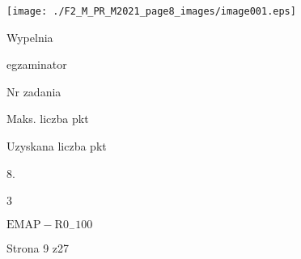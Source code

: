 \documentclass[a4paper,12pt]{article}
\begin{document}
\begin{center}
\texttt{[image: ./F2\_M\_PR\_M2021\_page8\_images/image001.eps]}
\end{center}
Wypelnia

egzaminator

Nr zadania

Maks. liczba pkt

Uzyskana liczba pkt

8.

3

$\mathrm{E}\mathrm{M}\mathrm{A}\mathrm{P}-\mathrm{R}0_{-}100$

Strona 9 z27
\end{document}
